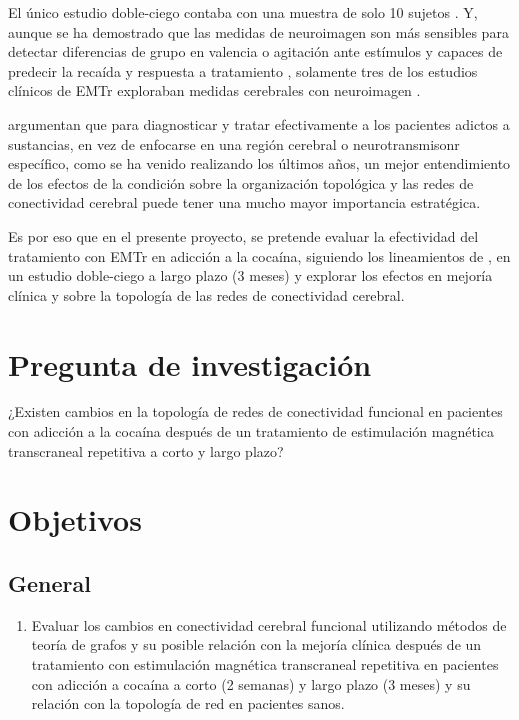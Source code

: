 El único estudio doble-ciego contaba con una muestra de solo 10 sujetos \parencite{Bolloni2016}.
Y, aunque se ha demostrado que las medidas de neuroimagen son más sensibles para detectar diferencias de grupo en valencia o agitación ante estímulos \parencite{Goldstein2012a} y capaces de predecir la recaída y respuesta a tratamiento \parencite{Suckling2017}, solamente tres de los estudios clínicos de EMTr exploraban medidas cerebrales con neuroimagen \parencite{Kearney-Ramos2018a, Kearney-Ramos2019, Hanlon2015}. \par
\textcite{Steele2018} argumentan que para diagnosticar y tratar efectivamente a los pacientes adictos a sustancias, en vez de enfocarse en una región cerebral o neurotransmisonr específico, como se ha venido realizando los últimos años, un mejor entendimiento de los efectos de la condición sobre la organización topológica y las redes de conectividad cerebral puede tener una mucho mayor importancia estratégica. \par
Es por eso que en el presente proyecto, se pretende evaluar la efectividad del tratamiento con EMTr en adicción a la cocaína, siguiendo los lineamientos de \textcite{Ekhtiari2019}, en un estudio doble-ciego a largo plazo (3 meses) y explorar los efectos en mejoría clínica y sobre la topología de las redes de conectividad cerebral.

\section{Pregunta de investigación}
¿Existen cambios en la topología de redes de conectividad funcional en pacientes con adicción a la cocaína después de un tratamiento de estimulación magnética transcraneal repetitiva a corto y largo plazo?

\section{Objetivos}
\subsection{General}
\begin{enumerate}[label=General., left= \parindent]
    \item Evaluar los cambios en conectividad cerebral funcional utilizando métodos de teoría de grafos y su posible relación con la mejoría clínica después de un tratamiento con estimulación magnética transcraneal repetitiva en pacientes con adicción a cocaína a corto (2 semanas) y largo plazo (3 meses) y su relación con la topología de red en pacientes sanos.
\end{enumerate}
